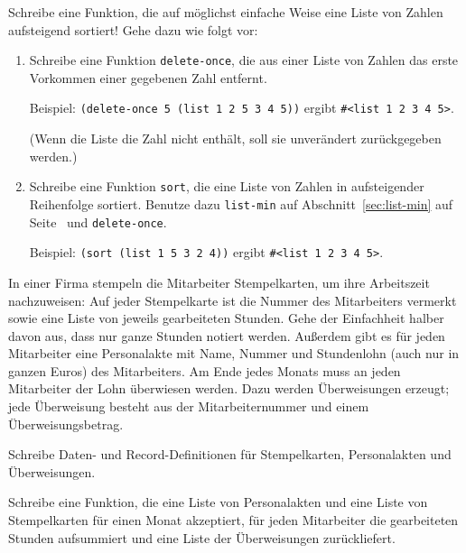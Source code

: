 \begin{aufgabe}
  Schreibe eine Funktion, die auf möglichst
  einfache Weise eine Liste von Zahlen aufsteigend sortiert! Gehe
  dazu wie folgt vor:
  \begin{enumerate}
  \item Schreibe eine Funktion
    \lstinline{delete-once}, die aus einer Liste von Zahlen das erste
    Vorkommen einer gegebenen Zahl entfernt.

    Beispiel: \lstinline{(delete-once 5 (list 1 2 5 3 4 5))} ergibt
    \lstinline{#<list 1 2 3 4 5>}.
    
    (Wenn die Liste die Zahl nicht enthält,
    soll sie unverändert zurückgegeben werden.)
  \item  Schreibe eine Funktion \lstinline{sort}, die
    eine Liste von Zahlen in aufsteigender Reihenfolge sortiert.
    Benutze dazu \lstinline{list-min} auf Abschnitt~\ref{sec:list-min}
    auf Seite~\pageref{sec:list-min} und \lstinline{delete-once}.

    Beispiel: \lstinline{(sort (list 1 5 3 2 4))} ergibt
    \lstinline{#<list 1 2 3 4 5>}.

  \end{enumerate}
\end{aufgabe}

\begin{aufgabe}
   In einer Firma stempeln die Mitarbeiter Stempelkarten, um ihre
  Arbeitszeit nachzuweisen: Auf jeder Stempelkarte ist die Nummer des
  Mitarbeiters vermerkt sowie eine Liste von jeweils gearbeiteten
  Stunden. Gehe der Einfachheit halber davon aus, dass nur ganze Stunden
  notiert werden.
  Außerdem gibt es für jeden Mitarbeiter eine Personalakte
  mit Name, Nummer und Stundenlohn (auch nur in ganzen Euros) des Mitarbeiters.
  Am Ende jedes Monats 
  muss an jeden Mitarbeiter der Lohn überwiesen werden.  Dazu werden
  Überweisungen erzeugt; jede Überweisung besteht aus der
  Mitarbeiternummer und einem Überweisungsbetrag.

  Schreibe Daten- und Record-Definitionen für Stempelkarten,
  Personalakten und Überweisungen.

  Schreibe eine Funktion, die eine Liste von Personalakten
  und eine Liste von Stempelkarten für einen Monat akzeptiert, für jeden
  Mitarbeiter die gearbeiteten Stunden aufsummiert und eine
  Liste der Überweisungen zurückliefert.
\end{aufgabe}

